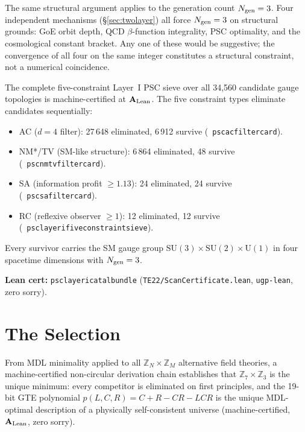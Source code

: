 \documentclass[11pt,openany]{book}
\theoremstyle{remark}
\newcommand{\lean}[1]{%
  \penalty-100
  \begingroup\def\_{\textunderscore\allowbreak}\texttt{#1}\endgroup}
\newcommand{\poly}{p(L,C,R)}
\newcommand{\Ngen}{N_{\rm gen}}
\newcommand{\CatAL}{\ensuremath{\textbf{A}_{\rm Lean}}}
\begin{document}
The same structural argument applies to the generation count $\Ngen = 3$.
Four independent mechanisms (§\ref{sec:twolayer}) all force $\Ngen = 3$ on structural
grounds: GoE orbit depth, QCD $\beta$-function integrality, PSC optimality, and the
cosmological constant bracket. Any one of these would be suggestive; the convergence
of all four on the same integer constitutes a structural constraint, not a numerical
coincidence.

\begin{tcolorbox}[colback=orange!5,colframe=orange!60,title={Theorem: Layer~I Gauge-Group Anti-Numerology Certificate (\CatAL)}]
The complete five-constraint Layer~I PSC sieve over all 34,560 candidate gauge
topologies is machine-certified at \CatAL.  The five constraint types eliminate
candidates sequentially:
\begin{itemize}[leftmargin=*,noitemsep]
\item AC ($d{=}4$ filter): 27\,648 eliminated, 6\,912 survive \mbox{(\lean{psc\_ac\_filter\_card})}.
\item NM*/TV (SM-like structure): 6\,864 eliminated, 48 survive \mbox{(\lean{psc\_nm\_tv\_filter\_card})}.
\item SA (information profit ${\geq}1.13$): 24 eliminated, 24 survive \mbox{(\lean{psc\_sa\_filter\_card})}.
\item RC (reflexive observer ${\geq}1$): 12 eliminated, 12 survive \mbox{(\lean{psc\_layer\_i\_five\_constraint\_sieve})}.
\end{itemize}
Every survivor carries the SM gauge group $\mathrm{SU}(3)\times\mathrm{SU}(2)\times\mathrm{U}(1)$
in four spacetime dimensions with $N_{\rm gen}=3$.

\textbf{Lean cert:} \lean{psc\_layer\_i\_catal\_bundle}
(\texttt{TE22/ScanCertificate.lean}, \texttt{ugp-lean}, zero sorry).
\end{tcolorbox}

\FloatBarrier

\chapter{The Selection}
\label{chap:selection}

\begin{tcolorbox}[colback=blue!5,colframe=blue!50!black,title={Chapter~4 Claim}]
From MDL minimality applied to all $\mathbb{Z}_N\times\mathbb{Z}_M$ alternative field
theories, a machine-certified non-circular derivation chain establishes that
$\mathbb{Z}_7\times\mathbb{Z}_3$ is the unique minimum: every competitor is eliminated
on first principles, and the 19-bit GTE polynomial $\poly = C+R-CR-LCR$ is the unique
MDL-optimal description of a physically self-consistent universe (machine-certified, \CatAL,
zero sorry).
\end{tcolorbox}
\end{document}
